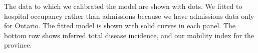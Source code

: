 \documentclass[12pt]{article}\usepackage[]{graphicx}\usepackage[]{color}
\begin{document}
The data to which we calibrated the model are shown with dots.
We fitted to hospital occupancy rather than admissions because
we have admissions data only for Ontario.  The fitted model
is shown with solid curves in each panel.
The bottom row shows inferred total disease incidence, 
and 
our mobility index for the province.

\FloatBarrier
\clearpage


\clearpage



\end{document}
